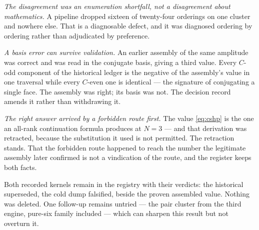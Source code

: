 \emph{The disagreement was an enumeration shortfall, not a
disagreement about mathematics.} A pipeline dropped sixteen of
twenty-four orderings on one cluster and nowhere else. That is a
diagnosable defect, and it was diagnosed ordering by ordering rather
than adjudicated by preference.

\emph{A basis error can survive validation.} An earlier assembly of the
same amplitude was correct and was read in the conjugate basis, giving
a third value. Every $C$-odd component of the historical ledger is the
negative of the assembly's value in one traversal while every $C$-even
one is identical --- the signature of conjugating a single face. The
assembly was right; its basis was not. The decision record amends it
rather than withdrawing it.

\emph{The right answer arrived by a forbidden route first.} The value
\eqref{eq:cshp} is the one an all-rank continuation formula produces at
$N=3$ --- and that derivation was retracted, because the substitution it
used is not permitted. The retraction stands. That the forbidden route
happened to reach the number the legitimate assembly later confirmed is
not a vindication of the route, and the register keeps both facts.

\begin{scopenote}
Both recorded kernels remain in the registry with their verdicts: the
historical superseded, the cold dump falsified, beside the proven
assembled value. Nothing was deleted. One follow-up remains untried ---
the pair cluster from the third engine, pure-six family included ---
which can sharpen this result but not overturn it.
\end{scopenote}
